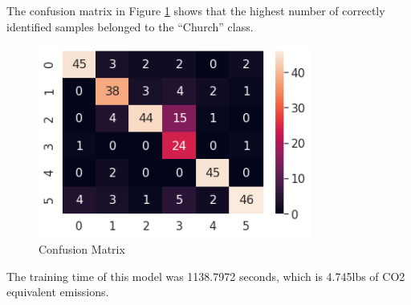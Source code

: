 The confusion matrix in Figure \ref{fig:q1pematrix} shows that the highest
number of correctly identified samples belonged to the ``Church'' class.

\begin{figure}[H]
	\centering
	\includegraphics[width=0.8\textwidth]{images/q1/pe/matrix}
	\caption{Confusion Matrix}
	\label{fig:q1pematrix}
\end{figure}

The training time of this model was 1138.7972 seconds, which is 4.745lbs of CO2
equivalent emissions.
